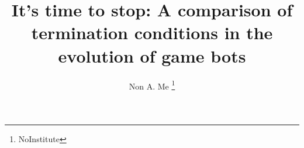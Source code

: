 \documentclass[runningheads,a4paper]{llncs}
\begin{document}
\mainmatter  %

\title{It's time to stop: A comparison of termination conditions in the evolution of game bots}


%
%
\author{Non A. Me%
\thanks{NoInstitute}}
%


%
%

\maketitle
\end{document}
